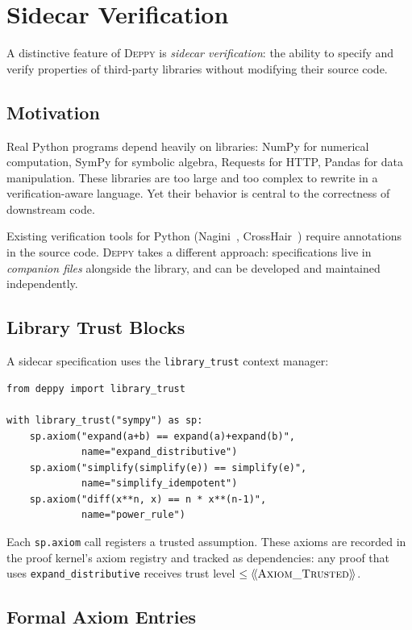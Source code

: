 \documentclass[acmsmall,nonacm,screen]{acmart}
\newcommand{\deppy}{\textsc{Deppy}}
\newcommand{\trustlevel}[1]{\ensuremath{\langle\!\langle \text{#1} \rangle\!\rangle}}
\begin{document}
\section{Sidecar Verification}\label{sec:sidecar}

A distinctive feature of \deppy{} is \emph{sidecar verification}:
the ability to specify and verify properties of third-party libraries
without modifying their source code.

\subsection{Motivation}

Real Python programs depend heavily on libraries: NumPy for numerical
computation, SymPy for symbolic algebra, Requests for HTTP, Pandas for
data manipulation.  These libraries are too large and too complex to
rewrite in a verification-aware language.  Yet their behavior is
central to the correctness of downstream code.

Existing verification tools for Python (Nagini~\cite{nagini},
CrossHair~\cite{crosshair}) require annotations in the source code.
\deppy{} takes a different approach: specifications live in
\emph{companion files} alongside the library, and can be developed
and maintained independently.

\subsection{Library Trust Blocks}

A sidecar specification uses the \texttt{library\_trust} context
manager:

\begin{lstlisting}[language=deppy]
from deppy import library_trust

with library_trust("sympy") as sp:
    sp.axiom("expand(a+b) == expand(a)+expand(b)",
             name="expand_distributive")
    sp.axiom("simplify(simplify(e)) == simplify(e)",
             name="simplify_idempotent")
    sp.axiom("diff(x**n, x) == n * x**(n-1)",
             name="power_rule")
\end{lstlisting}

Each \texttt{sp.axiom} call registers a trusted assumption.  These
axioms are recorded in the proof kernel's axiom registry and tracked
as dependencies: any proof that uses \texttt{expand\_distributive}
receives trust level $\le \trustlevel{\textsc{Axiom\_Trusted}}$.

\subsection{Formal Axiom Entries}
\end{document}

